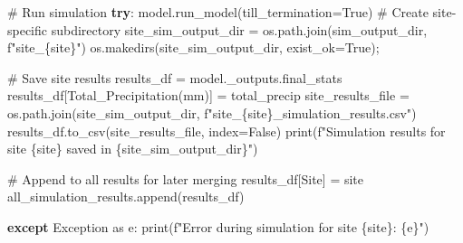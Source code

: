 \documentclass[
  letterpaper,
  DIV=11,
  numbers=noendperiod]{scrartcl}
\newenvironment{Shaded}{\begin{snugshade}}{\end{snugshade}}
\newcommand{\BuiltInTok}[1]{\textcolor[rgb]{0.00,0.23,0.31}{#1}}
\newcommand{\CommentTok}[1]{\textcolor[rgb]{0.37,0.37,0.37}{#1}}
\newcommand{\ControlFlowTok}[1]{\textcolor[rgb]{0.00,0.23,0.31}{\textbf{#1}}}
\newcommand{\ImportTok}[1]{\textcolor[rgb]{0.00,0.46,0.62}{#1}}
\newcommand{\NormalTok}[1]{\textcolor[rgb]{0.00,0.23,0.31}{#1}}
\newcommand{\OperatorTok}[1]{\textcolor[rgb]{0.37,0.37,0.37}{#1}}
\newcommand{\PreprocessorTok}[1]{\textcolor[rgb]{0.68,0.00,0.00}{#1}}
\newcommand{\SpecialCharTok}[1]{\textcolor[rgb]{0.37,0.37,0.37}{#1}}
\newcommand{\SpecialStringTok}[1]{\textcolor[rgb]{0.13,0.47,0.30}{#1}}
\newcommand{\StringTok}[1]{\textcolor[rgb]{0.13,0.47,0.30}{#1}}
\newcommand{\VariableTok}[1]{\textcolor[rgb]{0.07,0.07,0.07}{#1}}
\begin{document}
\begin{Shaded}
\begin{Highlighting}[]
    \CommentTok{\# Run simulation}
    \ControlFlowTok{try}\NormalTok{:}
\NormalTok{        model.run\_model(till\_termination}\OperatorTok{=}\VariableTok{True}\NormalTok{)}
        \CommentTok{\# Create site{-}specific subdirectory}
\NormalTok{        site\_sim\_output\_dir }\OperatorTok{=}\NormalTok{ os.path.join(sim\_output\_dir, }\SpecialStringTok{f"site\_}\SpecialCharTok{\{}\NormalTok{site}\SpecialCharTok{\}}\SpecialStringTok{"}\NormalTok{)}
\NormalTok{        os.makedirs(site\_sim\_output\_dir, exist\_ok}\OperatorTok{=}\VariableTok{True}\NormalTok{)}\OperatorTok{;}

        \CommentTok{\# Save site results}
\NormalTok{        results\_df }\OperatorTok{=}\NormalTok{ model.\_outputs.final\_stats}
\NormalTok{        results\_df[}\StringTok{\textquotesingle{}Total\_Precipitation(mm)\textquotesingle{}}\NormalTok{] }\OperatorTok{=}\NormalTok{ total\_precip}
\NormalTok{        site\_results\_file }\OperatorTok{=}\NormalTok{ os.path.join(site\_sim\_output\_dir, }\SpecialStringTok{f"site\_}\SpecialCharTok{\{}\NormalTok{site}\SpecialCharTok{\}}\SpecialStringTok{\_simulation\_results.csv"}\NormalTok{)}
\NormalTok{        results\_df.to\_csv(site\_results\_file, index}\OperatorTok{=}\VariableTok{False}\NormalTok{)}
        \BuiltInTok{print}\NormalTok{(}\SpecialStringTok{f"Simulation results for site }\SpecialCharTok{\{}\NormalTok{site}\SpecialCharTok{\}}\SpecialStringTok{ saved in }\SpecialCharTok{\{}\NormalTok{site\_sim\_output\_dir}\SpecialCharTok{\}}\SpecialStringTok{"}\NormalTok{)}

        \CommentTok{\# Append to all results for later merging}
\NormalTok{        results\_df[}\StringTok{\textquotesingle{}Site\textquotesingle{}}\NormalTok{] }\OperatorTok{=}\NormalTok{ site}
\NormalTok{        all\_simulation\_results.append(results\_df)}

    \ControlFlowTok{except} \PreprocessorTok{Exception} \ImportTok{as}\NormalTok{ e:}
        \BuiltInTok{print}\NormalTok{(}\SpecialStringTok{f"Error during simulation for site }\SpecialCharTok{\{}\NormalTok{site}\SpecialCharTok{\}}\SpecialStringTok{: }\SpecialCharTok{\{}\NormalTok{e}\SpecialCharTok{\}}\SpecialStringTok{"}\NormalTok{)}
\end{Highlighting}
\end{Shaded}
\end{document}
